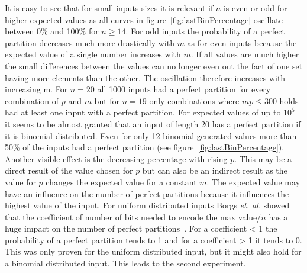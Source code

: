 It is easy to see that for small inputs sizes it is relevant if $n$ is even or odd for higher expected values as all curves in figure~\ref{fig:lastBinPercentage} oscillate between 0\% and 100\% for $n\ge14$.
For odd inputs the probability of a perfect partition decreases much more drastically with $m$ as for even inputs because the expected value of a single number increases with $m$.
If all values are much higher the small differences between the values can no longer even out the fact of one set having more elements than the other.
The oscillation therefore increases with increasing m.
For $n=20$ all 1000 inputs had a perfect partition for every combination of $p$ and $m$ but for $n=19$ only combinations where $mp\le300$ holds had at least one input with a perfect partition.
For expected values of up to $10^5$ it seems to be almost granted that an input of length 20 has a perfect partition if it is binomial distributed.
Even for only 12 binomial generated values more than 50\% of the inputs had a perfect partition (see figure~\ref{fig:lastBinPercentage}).
Another visible effect is the decreasing percentage with rising $p$.
This may be a direct result of the value chosen for $p$ but can also be an indirect result as the value for $p$ changes the expected value for a constant $m$.
The expected value may have an influence on the number of perfect partitions because it influences the highest value of the input.
For uniform distributed inputs Borgs \emph{et. al.} showed that the coefficient of number of bits needed to encode the max value/$n$ has a huge impact on the number of perfect partitions~\cite{borgs2001phase}.
For a coefficient < 1 the probability of a perfect partition tends to 1 and for a coefficient > 1 it tends to 0.
This was only proven for the uniform distributed input, but it might also hold for a binomial distributed input.
This leads to the second experiment.

